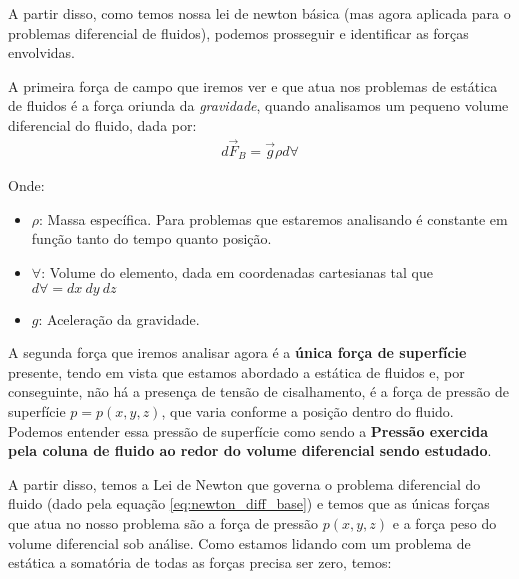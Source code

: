 \documentclass{article}
\begin{document}
            A partir disso, como temos nossa lei de newton básica (mas agora aplicada para o problemas diferencial de fluidos), podemos prosseguir e identificar as forças envolvidas.

            A primeira força de campo que iremos ver e que atua nos problemas de estática de fluidos é a força oriunda da \emph{gravidade}, quando analisamos um pequeno volume diferencial do fluido, dada por:
            \begin{align}
                d\vec{F}_B = \vec{g}\rho d \forall \label{eq:forca_peso}
            \end{align}

            Onde:
            \begin{itemize}
                \item $\rho$: Massa específica. Para problemas que estaremos analisando é constante em função tanto do tempo quanto posição.
                \item $\forall$: Volume do elemento, dada em coordenadas cartesianas tal que $d\forall = dx \ dy \ dz$
                \item $g$: Aceleração da gravidade.
            \end{itemize}

            A segunda força que iremos analisar agora é a \textbf{única força de superfície} presente, tendo em vista que estamos abordado a estática de fluidos e, por conseguinte, não há a presença
            de tensão de cisalhamento, é a força de pressão de superfície $p = p(x, y, z)$, que varia conforme a posição dentro do fluido. Podemos entender essa pressão de superfície como sendo a 
            \textbf{Pressão exercida pela coluna de fluido ao redor do volume diferencial sendo estudado}.

            A partir disso, temos a Lei de Newton que governa o problema diferencial do fluido (dado pela equação \ref{eq:newton_diff_base}) e temos que as únicas forças que atua no nosso problema são a
            força de pressão $p(x, y, z)$ e a força peso do volume diferencial sob análise. Como estamos lidando com um problema de estática a somatória de todas as forças precisa ser zero, temos:


    
\end{document}
